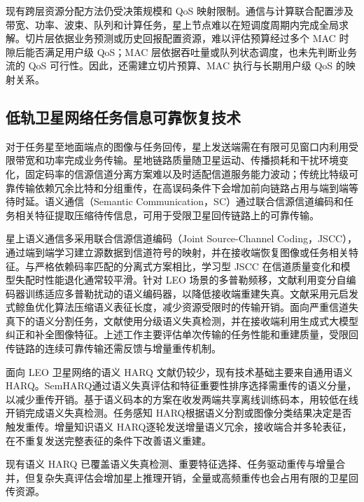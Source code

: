 现有跨层资源分配方法仍受决策规模和 QoS 映射限制。通信与计算联合配置涉及带宽、功率、波束、队列和计算任务，星上节点难以在短调度周期内完成全局求解。切片层依据业务预测或历史回报配置资源，难以评估预算经过多个 MAC 时隙后能否满足用户级 QoS；MAC 层依据吞吐量或队列状态调度，也未先判断业务流的 QoS 可行性。因此，还需建立切片预算、MAC 执行与长期用户级 QoS 的映射关系。

\subsection{低轨卫星网络任务信息可靠恢复技术}

对于任务星至地面端点的图像与任务回传，星上发送端需在有限可见窗口内利用受限带宽和功率完成业务传输。星地链路质量随卫星运动、传播损耗和干扰环境变化\cite{Kim-InBandCoexistence-TWC25}，固定码率的信源信道分离方案难以及时适配信道服务能力波动；传统比特级可靠传输依赖冗余比特和分组重传，在高误码条件下会增加前向链路占用与端到端等待时延。语义通信（Semantic Communication，SC）通过联合信源信道编码和任务相关特征提取压缩待传信息，可用于受限卫星回传链路上的可靠传输。

星上语义通信多采用联合信源信道编码（Joint Source-Channel Coding，JSCC），通过端到端学习建立源数据到信道符号的映射，并在接收端恢复图像或任务相关特征。与严格依赖码率匹配的分离式方案相比，学习型 JSCC 在信道质量变化和模型失配时性能退化通常较平滑\cite{Bourtsoulatze-DeepJSCC-ICASSP19}。针对 LEO 场景的多普勒频移，文献\cite{Seon-DopplerSC-IoTJ25}利用变分自编码器训练适应多普勒扰动的语义编码器，以降低接收端重建失真。文献\cite{hassan-semanticSat-globecom2024}采用元启发式鲸鱼优化算法压缩语义表征长度，减少资源受限时的传输开销。面向严重信道失真下的语义分割任务，文献\cite{jiang-semanticSat-JSAC2025}使用分级语义失真检测，并在接收端利用生成式大模型纠正和补全图像特征。上述工作主要评估单次传输的任务性能和重建质量，受限回传链路的连续可靠传输还需反馈与增量重传机制。

面向 LEO 卫星网络的语义 HARQ 文献仍较少，现有技术基础主要来自通用语义 HARQ。SemHARQ\cite{hu-SemHARQ-JSAC25}通过语义失真评估和特征重要性排序选择需重传的语义分量，以减少重传开销。基于语义码本的方案\cite{liang-SemanticCodebookHARQ-TCOMM25}在收发两端共享离线训练码本，用较低在线开销完成语义失真检测。任务感知 HARQ\cite{Sheng-SCCoopPerception-TCCN26}根据语义分割或图像分类结果决定是否触发重传。增量知识语义 HARQ\cite{zhou-ABRControl-HARQ-SemanticCommunication-OJCOMS2022}逐轮发送增量语义冗余，接收端合并多轮表征，在不重复发送完整表征的条件下改善语义重建。

现有语义 HARQ 已覆盖语义失真检测、重要特征选择、任务驱动重传与增量合并，但复杂失真评估会增加星上推理开销，全量或高频重传也会占用有限的卫星回传资源。

